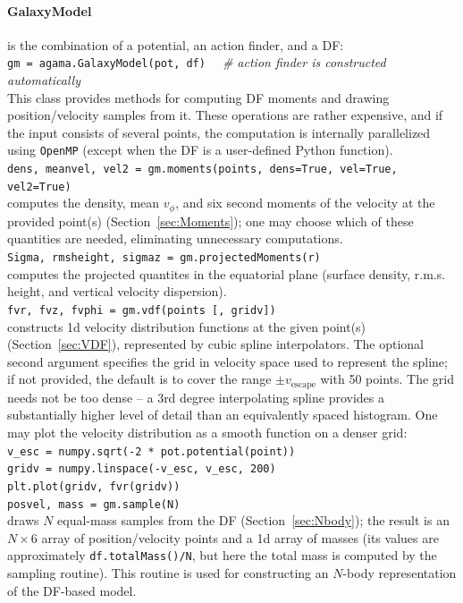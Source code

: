 \documentclass[12pt]{article}
\begin{document}
\paragraph{GalaxyModel} is the combination of a potential, an action finder, and a DF:\\
\texttt{gm = agama.GalaxyModel(pot, df)}
\textit{\color{Sepia}\ \ \# action finder is constructed automatically} \\[2mm]
This class provides methods for computing DF moments and drawing position/velocity samples from it. These operations are rather expensive, and if the input consists of several points, the computation is internally parallelized using \texttt{OpenMP} (except when the DF is a user-defined Python function).\\[2mm]
\texttt{dens, meanvel, vel2 = gm.moments(points, dens=True, vel=True, vel2=True)}\\
computes the density, mean $v_\phi$, and six second moments of the velocity at the provided point(s) (Section~\ref{sec:Moments}); one may choose which of these quantities are needed, eliminating unnecessary computations.\\[2mm]
\texttt{Sigma, rmsheight, sigmaz = gm.projectedMoments(r)}\\
computes the projected quantites in the equatorial plane (surface density, r.m.s. height, and vertical velocity dispersion).\\[2mm]
\texttt{fvr, fvz, fvphi = gm.vdf(points [, gridv])}\\
constructs 1d velocity distribution functions at the given point(s) (Section~\ref{sec:VDF}), represented by cubic spline interpolators. The optional second argument specifies the grid in velocity space used to represent the spline; if not provided, the default is to cover the range $\pm v_\mathrm{escape}$ with 50 points. The grid needs not be too dense -- a 3rd degree interpolating spline provides a substantially higher level of detail than an equivalently spaced histogram.
One may plot the velocity distribution as a smooth function on a denser grid:\\
\texttt{v_esc = numpy.sqrt(-2 * pot.potential(point))\\
gridv = numpy.linspace(-v_esc, v_esc, 200)\\
plt.plot(gridv, fvr(gridv))} \\[2mm]
\texttt{posvel, mass = gm.sample(N)}\\
draws $N$ equal-mass samples from the DF (Section~\ref{sec:Nbody}); the result is an $N\times6$ array of position/velocity points and a 1d array of masses (its values are approximately \texttt{df.totalMass()/N}, but here the total mass is computed by the sampling routine). This routine is used for constructing an $N$-body representation of the DF-based model.\\[2mm]
\end{document}
